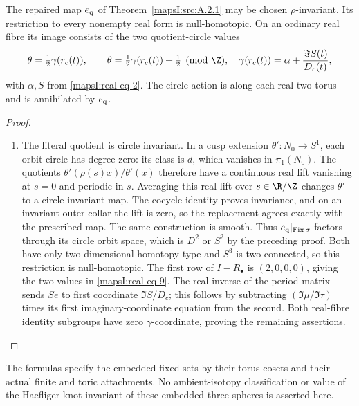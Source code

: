 \begin{proposition}\hypertarget{tag-02PH}{}\label{mapsI:src:A.3.4}

The repaired map $e_{\rm q}$ of Theorem~\ref{mapsI:src:A.2.1} may be chosen $\rho$-invariant. Its restriction to
every nonempty real form is null-homotopic. On an ordinary real fibre
its image consists of the two quotient-circle values
\[
 \theta=\tfrac12\gamma(r_c(t)),\qquad
 \theta=\tfrac12\gamma(r_c(t))+\tfrac12\pmod\Z,
 \quad
 \gamma(r_c(t))=\alpha+\frac{\Im S(t)}{D_c(t)},
 \label{mapsI:real-eq-9}
\]
with $\alpha,S$ from \eqref{mapsI:real-eq-2}. The circle action is along each real
two-torus and is annihilated by $e_{\rm q}$.
\end{proposition}



\begin{proof}
\begin{enumerate}[label=\arabic*.,leftmargin=*]
\item The literal quotient is circle invariant. In a cusp extension
$\theta':N_0\to S^1$, each orbit circle has degree zero: its class is
$d$, which vanishes in $\pi_1(N_0)$. The quotients
$\theta'(\rho(s)x)/\theta'(x)$ therefore have a continuous real lift
vanishing at $s=0$ and periodic in $s$. Averaging this real lift over
$s\in\R/\Z$ changes $\theta'$ to a circle-invariant map. The cocycle
identity proves invariance, and on an invariant outer collar the lift
is zero, so the replacement agrees exactly with the prescribed map.
The same construction is smooth. Thus $e_{\rm q}|_{\operatorname{Fix}\sigma}$
factors through its circle orbit space, which is $D^2$ or $S^2$ by the
preceding proof. Both have only two-dimensional homotopy type and
$S^3$ is two-connected, so this restriction is null-homotopic.
The first row of $I-R_\bullet$ is $(2,0,0,0)$, giving the two values
in \eqref{mapsI:real-eq-9}. The real inverse of the period matrix sends $S e$ to
first coordinate $\Im S/D_c$; this follows by subtracting
$(\Im\mu/\Im\tau)$ times its first imaginary-coordinate equation
from the second. Both real-fibre identity subgroups have zero
$\gamma$-coordinate, proving the remaining assertions.
\end{enumerate}
\end{proof}

The formulas specify the embedded fixed sets by their torus cosets and
their actual finite and toric attachments. No ambient-isotopy
classification or value of the Haefliger knot invariant of these
embedded three-spheres is asserted here.


